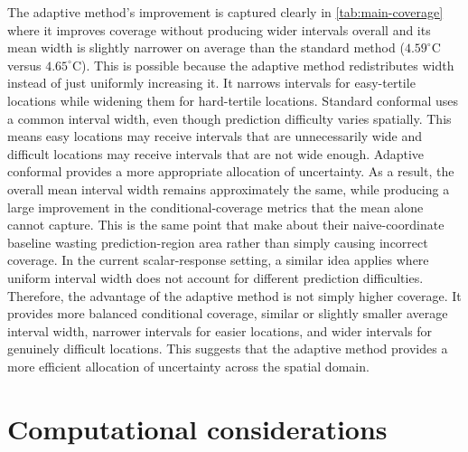 The adaptive method's improvement is captured clearly in \cref{tab:main-coverage} where it improves coverage without producing wider intervals overall and its mean width is slightly narrower on average than the standard method ($4.59^\circ\mathrm{C}$ versus $4.65^\circ\mathrm{C}$). This is possible because the adaptive method redistributes width instead of just uniformly increasing it. It narrows intervals for easy-tertile locations while widening them for hard-tertile locations. Standard conformal uses a common interval width, even though prediction difficulty varies spatially. This means easy locations may receive intervals that are unnecessarily wide and difficult locations may receive intervals that are not wide enough. Adaptive conformal provides a more appropriate allocation of uncertainty. As a result, the overall mean interval width remains approximately the same, while producing a large improvement in the conditional-coverage metrics that the mean alone cannot capture. This is the same point that \citeauthor{amirishahbazi2026} make about their naive-coordinate baseline wasting prediction-region area rather than simply causing incorrect coverage. In the current scalar-response setting, a similar idea applies where uniform interval width does not account for different prediction difficulties. Therefore, the advantage of the adaptive method is not simply higher coverage. It provides more balanced conditional coverage, similar or slightly smaller average interval width, narrower intervals for easier locations, and wider intervals for genuinely difficult locations. This suggests that the adaptive method provides a more efficient allocation of uncertainty across the spatial domain.
 
\section{Computational considerations}

